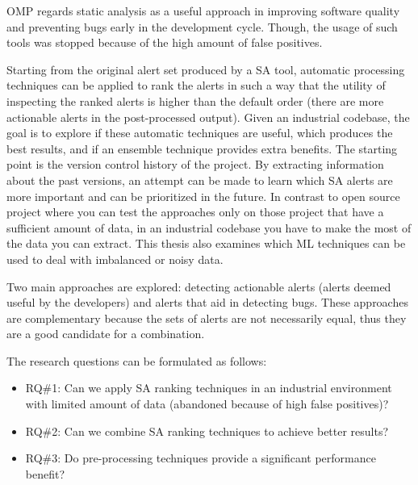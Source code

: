 OMP regards static analysis as a useful approach in improving software quality and preventing bugs early in the development cycle. Though, the usage of such tools was stopped because of the high amount of false positives.

Starting from the original alert set produced by a SA tool, automatic processing techniques can be applied to rank the alerts in such a way that the utility of inspecting the ranked alerts is higher than the default order (there are more actionable alerts in the post-processed output). Given an industrial codebase, the goal is to explore if these automatic techniques are useful, which produces the best results, and if an ensemble technique provides extra benefits. The starting point is the version control history of the project. By extracting information about the past versions, an attempt can be made to learn which SA alerts are more important and can be prioritized in the future. In contrast to open source project where you can test the approaches only on those project that have a sufficient amount of data, in an industrial codebase you have to make the most of the data you can extract. This thesis also examines which ML techniques can be used to deal with imbalanced or noisy data.


Two main approaches are explored: detecting actionable alerts (alerts deemed useful by the developers) and alerts that aid in detecting bugs. These approaches are complementary because the sets of alerts are not necessarily equal, thus they are a good candidate for a combination.

The research questions can be formulated as follows:
\begin{itemize}
    \item RQ\#1: Can we apply SA ranking techniques in an industrial environment with limited amount of data (abandoned because of high false positives)?
    \item RQ\#2: Can we combine SA ranking techniques to achieve better results?
    \item RQ\#3: Do pre-processing techniques provide a significant performance benefit?
\end{itemize}

